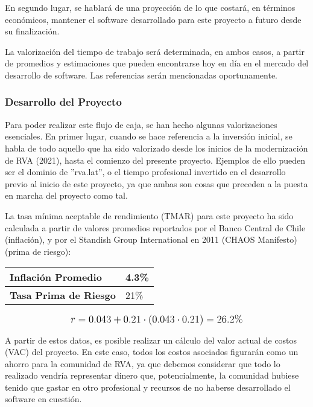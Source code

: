 En segundo lugar, se hablará de una proyección de lo que costará, en términos económicos, mantener el software desarrollado para este proyecto a futuro desde su finalización.

La valorización del tiempo de trabajo será determinada, en ambos casos, a partir de promedios y estimaciones que pueden encontrarse hoy en día en el mercado del desarrollo de software. Las referencias serán mencionadas oportunamente.

\subsubsection{Desarrollo del Proyecto}
Para poder realizar este flujo de caja, se han hecho algunas valorizaciones esenciales. En primer lugar, cuando se hace referencia a la inversión inicial, se habla de todo aquello que ha sido valorizado desde los inicios de la modernización de RVA (2021), hasta el comienzo del presente proyecto. Ejemplos de ello pueden ser el dominio de ''rva.lat'', o el tiempo profesional invertido en el desarrollo previo al inicio de este proyecto, ya que ambas son cosas que preceden a la puesta en marcha del proyecto como tal.

La tasa mínima aceptable de rendimiento (TMAR) para este proyecto ha sido calculada a partir de valores promedios reportados por el Banco Central de Chile (inflación), y por el Standish Group International en 2011 (CHAOS Manifesto) (prima de riesgo):

\begin{center}
	\begin{tabular}{ | p{7cm} | p{5cm}|}
		\hline
		{\textbf{Inflación Promedio}} & 4.3\%  \\ \hline
		{\textbf{Tasa Prima de Riesgo}} & 21\% \\ \hline
	\end{tabular}
\end{center}


\[
\mathlarger{
	r = 0.043+0.21\cdot(0.043\cdot0.21) = 26.2\%
}
\]

A partir de estos datos, es posible realizar un cálculo del valor actual de costos (VAC) del proyecto. En este caso, todos los costos asociados figurarán como un ahorro para la comunidad de RVA, ya que debemos considerar que todo lo realizado vendría representar dinero que, potencialmente, la comunidad hubiese tenido que gastar en otro profesional y recursos de no haberse desarrollado el software en cuestión.

